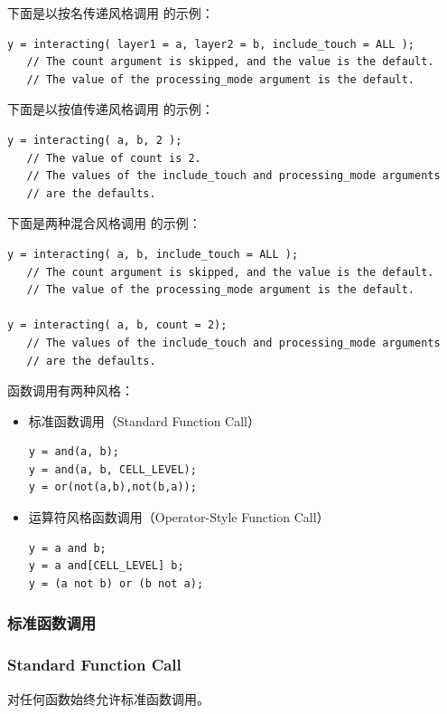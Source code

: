 下面是以按名传递风格调用  的示例：
\begin{lstlisting}[style=pxl]
y = interacting( layer1 = a, layer2 = b, include_touch = ALL );
   // The count argument is skipped, and the value is the default.
   // The value of the processing_mode argument is the default.
\end{lstlisting}

下面是以按值传递风格调用  的示例：
\begin{lstlisting}[style=pxl]
y = interacting( a, b, 2 );
   // The value of count is 2.
   // The values of the include_touch and processing_mode arguments
   // are the defaults.
\end{lstlisting}

下面是两种混合风格调用  的示例：
\begin{lstlisting}[style=pxl]
y = interacting( a, b, include_touch = ALL );
   // The count argument is skipped, and the value is the default.
   // The value of the processing_mode argument is the default.

y = interacting( a, b, count = 2);
   // The values of the include_touch and processing_mode arguments
   // are the defaults.
\end{lstlisting}

函数调用有两种风格：
\begin{itemize}
  \item 标准函数调用（Standard Function Call）
\begin{lstlisting}[style=pxl]
y = and(a, b);
y = and(a, b, CELL_LEVEL);
y = or(not(a,b),not(b,a));
\end{lstlisting}
  \item 运算符风格函数调用（Operator-Style Function Call）
\begin{lstlisting}[style=pxl]
y = a and b;
y = a and[CELL_LEVEL] b;
y = (a not b) or (b not a);
\end{lstlisting}
\end{itemize}

\subsubsection{标准函数调用}
\subsubsection*{Standard Function Call}

对任何函数始终允许标准函数调用。

